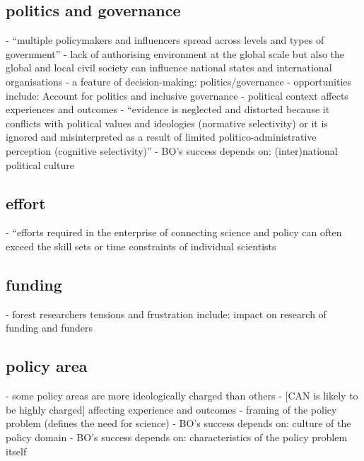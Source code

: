 \subsection{politics and governance}
\cite{CairneyW2017} - ``multiple policymakers and influencers spread across levels and types of government''
\cite{GeuijenMCRv2017} - lack of authorising environment at the global scale but also the global and local civil society can influence national states and international organisations
\cite{MoallemiZHSMZHKHMGLB2023} - a feature of decision-making: politics/governance
\cite{MoallemiZHSMZHKHMGLB2023} - opportunities include: Account for politics and inclusive governance
\cite{SaxonbergSL2023} - political context affects experiences and outcomes
\cite{StrassheimK2014} - ``evidence is neglected and distorted because it conflicts with political values and ideologies (normative selectivity) or it is ignored and misinterpreted as a result of limited politico-administrative perception (cognitive selectivity)''
\cite{WesselinkH2020} - BO's success depends on: (inter)national political culture 

\subsection{effort}
\cite{BednarekSHG2015} - ``efforts required in the enterprise of connecting science and policy can often exceed the skill sets or time constraints of individual scientists

\subsection{funding}
\cite{OjanenBKP2021} - forest researchers tensions and frustration include: impact on research of funding and funders

\subsection{policy area}
\cite{SaxonbergSL2023} - some policy areas are more ideologically charged than others - [CAN is likely to be highly charged] affecting experience and outcomes 
\cite{WesselinkH2020} - framing of the policy problem (defines the need for science)
\cite{WesselinkH2020} - BO's success depends on: culture of the policy domain
\cite{WesselinkH2020} - BO's success depends on: characteristics of the policy problem itself

